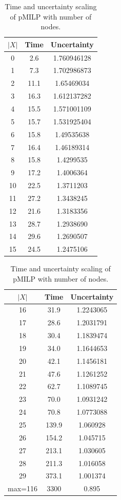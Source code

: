 \begin{table}[t!]
		\centering
		\hspace*{4ex}
		\begin{subtable}[b]{0.45\textwidth}
		\begin{tabular}{|c|c|c|}
		\hline
		$|X|$ & Time & Uncertainty\\ 
		\hline	0 & 2.6 & 1.760946128\\
		\hline	1 & 7.3 & 1.702986873\\
		\hline	2 & 11.1 & 1.65469034\\
		\hline	3 & 16.3 & 1.612137282\\
		\hline	4 & 15.5 & 1.571001109\\
		\hline	5 & 15.7 & 1.531925404\\
		\hline	6 & 15.8 & 1.49535638\\
		\hline	7 & 16.4 & 1.46189314\\
		\hline	8 &  15.8 & 1.4299535\\
		\hline	9 &  17.2 & 1.4006364\\
		\hline	10 & 22.5 & 1.3711203\\
		\hline	11 & 27.2 & 1.3438245\\
		\hline	12 & 21.6 & 1.3183356\\
		\hline	13 & 28.7 & 1.2938690\\
		\hline	14 & 29.6 & 1.2690507\\
		\hline	15 & 24.5 & 1.2475106\\
		\hline
	  \end{tabular}
	\end{subtable}
	\hfill
	\begin{subtable}[b]{0.45\textwidth}
		\begin{tabular}{|c|c|c|}
			\hline
			$|X|$ & Time & Uncertainty\\ 
		\hline	16 & 31.9 & 1.2243065\\
		\hline	17 & 28.6 & 1.2031791\\
		\hline	18 & 30.4 & 1.1839474\\
		\hline	19 & 34.0 & 1.1644653\\
		\hline	20 & 42.1 & 1.1456181\\
		\hline	21 & 47.6 & 1.1261252\\
		\hline	22 & 62.7 & 1.1089745\\
		\hline	23 & 70.0 & 1.0931242\\
		\hline	24 & 70.8 & 1.0773088\\
		\hline	25 & 139.9 & 1.060928\\
		\hline	26 & 154.2 & 1.045715\\
		\hline	27 & 213.1 & 1.030605 \\
		\hline	28 & 211.3 & 1.016058\\
		\hline	29 & 373.1 & 1.001374\\
		\hline max=116 & 3300 & 0.895\\ 
		\hline		
	  \end{tabular}
     \end{subtable}
	  \caption{Time and uncertainty scaling of pMILP with number of nodes.}
    	\label{table14}
\end{table}


